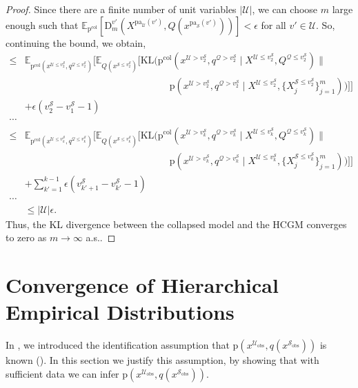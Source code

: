 \documentclass[12pt]{article}
\newcommand{\Sc}{\mathcal{S}}
\newcommand{\Uc}{\mathcal{U}}
\newcommand{\Qc}{\mathcal{Q}}
\newcommand{\pa}{\mathrm{pa}}
\newcommand{\pr}{\mathrm{p}}
\newcommand{\obs}{\mathrm{obs}}
\newcommand{\col}{\mathrm{col}}
\begin{document}
\begin{proof}
Since there are a finite number of unit variables $|\mathcal{U}|$, we can choose $m$ large enough such that $\mathbb{E}_{\pr^\col}[\mathrm{D}^{v'}_m(X^{\pa_\mathcal{U}(v')}, Q(x^{\pa_\mathcal{S}(v')}))] < \epsilon$ for all $v' \in \Uc$.
So, continuing the bound, we obtain,
\begin{equation*}
\begin{split}
\le & \mathbb{E}_{\pr^\col(x^{\Uc \le v_2^\Sc}, q^{\Qc \le v_2^\Sc})} [ \mathbb{E}_{Q(x^{\Sc \le v_2^\Sc})} [ \mathrm{KL}(\pr^\col(x^{\Uc > v^{\Sc}_2}, q^{\Qc > v^{\Sc}_2} \mid X^{\Uc \le v^{\Sc}_2}, Q^{\Qc \le v^{\Sc}_2}) \| \\ &\quad \quad \quad \quad \quad \quad \quad \quad \quad \quad \quad \quad\quad\quad\quad  \pr(x^{\Uc > v^{\Sc}_2}, q^{\Qc > v^{\Sc}_2} \mid X^{\Uc \le v^{\Sc}_2}, \{X_j^{\Sc \le v^{\Sc}_2}\}_{j=1}^m) )]]\\
&+ \epsilon(v_2^\Sc - v_1^\Sc - 1)\\
\cdots &  \\
\le & \mathbb{E}_{\pr^\col(x^{\Uc \le v_k^\Sc}, q^{\Qc \le v_k^\Sc})} [ \mathbb{E}_{Q(x^{\Sc \le v_k^\Sc})} [ \mathrm{KL}(\pr^\col(x^{\Uc > v^{\Sc}_k}, q^{\Qc > v^{\Sc}_k} \mid X^{\Uc \le v^{\Sc}_k}, Q^{\Qc \le v^{\Sc}_k}) \| \\ &\quad \quad \quad \quad \quad \quad \quad \quad \quad \quad \quad  \quad\quad\quad\quad\pr(x^{\Uc > v^{\Sc}_k}, q^{\Qc > v^{\Sc}_k} \mid X^{\Uc \le v^{\Sc}_k}, \{X_j^{\Sc \le v^{\Sc}_k}\}_{j=1}^m) )]]\\
&+ \sum_{k'=1}^{k-1} \epsilon(v_{k'+1}^\Sc - v_{k'}^\Sc - 1)\\
\cdots &\\
& \le |\Uc| \epsilon.
\end{split}
\end{equation*}
Thus, the KL divergence between the collapsed model and the HCGM converges to zero as $m \to \infty$ a.s..
\end{proof} \section{Convergence of Hierarchical Empirical Distributions} \label{apx:hier_empirical_convergence}

In , we introduced the identification assumption that $\pr(x^{\Uc_\obs}, q(x^{\Sc_\obs}))$ is known ().
In this section we justify this assumption, by showing that with sufficient data we can infer $\pr(x^{\Uc_\obs}, q(x^{\Sc_\obs}))$.
\end{document}
